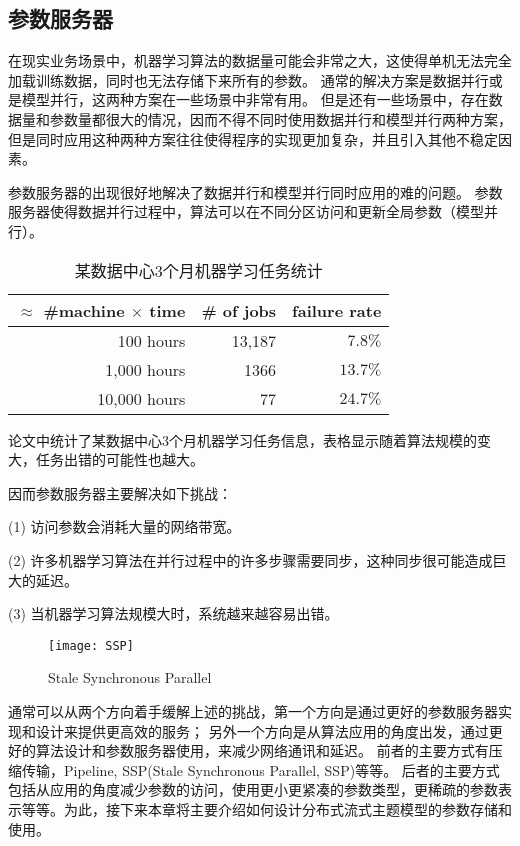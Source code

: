 \subsection{参数服务器}
在现实业务场景中，机器学习算法的数据量可能会非常之大，这使得单机无法完全加载训练数据，同时也无法存储下来所有的参数。
通常的解决方案是数据并行或是模型并行，这两种方案在一些场景中非常有用。
但是还有一些场景中，存在数据量和参数量都很大的情况，因而不得不同时使用数据并行和模型并行两种方案，但是同时应用这种两种方案往往使得程序的实现更加复杂，并且引入其他不稳定因素。

参数服务器的出现很好地解决了数据并行和模型并行同时应用的难的问题。
参数服务器使得数据并行过程中，算法可以在不同分区访问和更新全局参数（模型并行）。

\begin{table}\label{tab:jobs_failed} 
\center
\caption{某数据中心3个月机器学习任务统计}
\begin{tabular}{|r|r|r|}
\hline
$\approx$ \#machine $\times$ time & \# of jobs& failure rate \\
\hline
100 hours & 13,187 & $7.8\%$ \\
1,000 hours & 1366 & $13.7\%$ \\
10,000 hours & 77 & $24.7\%$ \\
\hline
\end{tabular}
\end{table}

论文\cite{li2014scaling}中统计了某数据中心3个月机器学习任务信息，表格显示随着算法规模的变大，任务出错的可能性也越大。

因而参数服务器主要解决如下挑战：

(1) 访问参数会消耗大量的网络带宽。

(2) 许多机器学习算法在并行过程中的许多步骤需要同步，这种同步很可能造成巨大的延迟。

(3) 当机器学习算法规模大时，系统越来越容易出错。


\begin{figure}[htb]\centering
\texttt{[image: SSP]}
\caption{Stale Synchronous Parallel}
\label{fig:SSP}       %
\end{figure}

通常可以从两个方向着手缓解上述的挑战，第一个方向是通过更好的参数服务器实现和设计来提供更高效的服务；
另外一个方向是从算法应用的角度出发，通过更好的算法设计和参数服务器使用，来减少网络通讯和延迟。
前者的主要方式有压缩传输，Pipeline, SSP(Stale Synchronous Parallel, SSP)等等。
后者的主要方式包括从应用的角度减少参数的访问，使用更小更紧凑的参数类型，更稀疏的参数表示等等。为此，接下来本章将主要介绍如何设计分布式流式主题模型的参数存储和使用。


